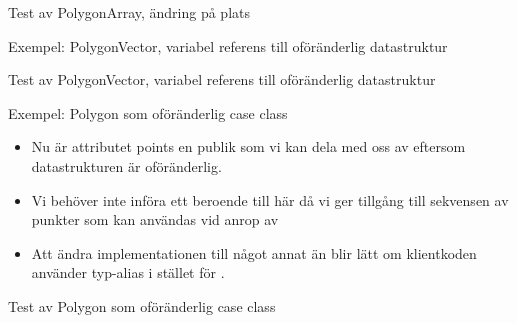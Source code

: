\begin{Slide}{Test av PolygonArray, ändring på plats}
\vspace{0em}
\end{Slide}


\begin{Slide}{Exempel: PolygonVector, variabel referens till oföränderlig datastruktur}
\vspace{-0.6em}
\end{Slide}

\begin{Slide}{Test av PolygonVector, variabel referens till oföränderlig datastruktur}
\vspace{0em}
\end{Slide}




\begin{Slide}{Exempel: Polygon som oföränderlig case class}
\vspace{-0.6em}
\begin{itemize}\SlideFontTiny
\item Nu är attributet points en publik  som vi kan dela med oss av eftersom datastrukturen  är oföränderlig.

\item Vi behöver inte införa ett beroende till  här då vi ger tillgång till sekvensen av punkter som kan användas vid anrop av 

\item Att ändra implementationen till något annat än  blir lätt om klientkoden använder typ-alias  i stället för . 
\end{itemize}
\end{Slide}

\begin{Slide}{Test av Polygon som oföränderlig case class}
\vspace{0em}
\end{Slide}


\fi







